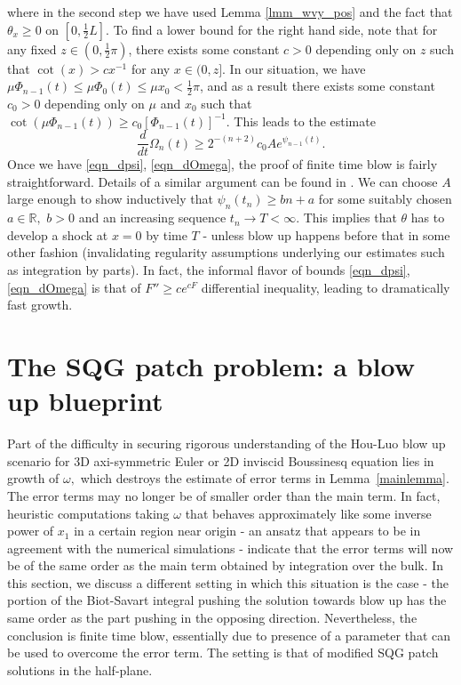 \documentclass[reqno,centertags, 11pt]{amsart}
\def \Rm {\mathbb R}
\begin{document}
where in the second step we have used Lemma \ref{lmm_wvy_pos} and the fact that $\theta_{x} \geq 0$ on $[0,\frac{1}{2} L]$. To find a lower bound for the right hand side, note that for any
fixed $z \in (0,\frac{1}{2} \pi)$, there exists some constant $c > 0$ depending only on $z$ such that $\cot(x) > cx^{-1}$ for any $x \in (0,z]$. In our situation, we have
$\mu \Phi_{n-1}(t) \leq \mu \Phi_{0}(t) \leq \mu x_{0} < \frac{1}{2} \pi$, and as a result there exists some constant $c_{0} > 0$ depending only on $\mu$ and $x_{0}$ such that
$\cot(\mu \Phi_{n-1}(t)) \geq c_{0} [\Phi_{n-1}(t)]^{-1}$. This leads to the estimate
\begin{equation}
  \frac{d}{dt} \Omega_{n}(t) \geq 2^{-(n+2)} c_{0} A e^{\psi_{n-1}(t)}.
  \label{eqn_dOmega}
\end{equation}
Once we have \eqref{eqn_dpsi}, \eqref{eqn_dOmega}, the proof of finite time blow is fairly straightforward. Details of a similar argument can be found in \cite{CKY}.
We can choose $A$ large enough to show inductively that
$\psi_n(t_n) \geq b n + a$ for some suitably chosen $a \in \Rm,$ $b >0$ and an increasing sequence $t_n \rightarrow T < \infty.$ This implies that $\theta$ has to develop a shock at
$x=0$ by time $T$ - unless blow up happens before that in some other fashion (invalidating regularity assumptions underlying our estimates such as integration by parts).
In fact, the informal flavor of bounds \eqref{eqn_dpsi}, \eqref{eqn_dOmega} is that of $F'' \geq ce^{cF}$ differential inequality, leading to dramatically fast growth.


\section{The SQG patch problem: a blow up blueprint}\label{patch}

Part of the difficulty in securing rigorous understanding of the Hou-Luo blow up scenario for 3D axi-symmetric Euler or 2D inviscid Boussinesq
equation lies in growth of $\omega,$ which destroys the estimate of error terms in Lemma~\ref{mainlemma}. The error terms may no longer be
of smaller order than the main term. In fact, heuristic computations taking $\omega$ that behaves approximately like some inverse power of $x_1$ in a certain
region near origin - an ansatz that appears to be in agreement with the numerical simulations - indicate that the error terms will now be
of the same order as the main term obtained by integration over the bulk. In this section, we discuss a different setting in which this
situation is the case - the portion of the Biot-Savart integral pushing the solution towards blow up has the same order as the part pushing
in the opposing direction. Nevertheless, the conclusion is finite time blow, essentially due to presence of a parameter that can be
used to overcome the error term. The setting is that of modified SQG patch solutions in the half-plane.
\end{document}
